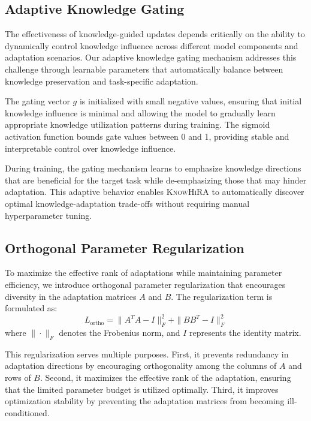 \documentclass[10pt,letterpaper]{article}
\begin{document}
\subsection{Adaptive Knowledge Gating}

The effectiveness of knowledge-guided updates depends critically on the ability to dynamically control knowledge influence across different model components and adaptation scenarios. Our adaptive knowledge gating mechanism addresses this challenge through learnable parameters that automatically balance between knowledge preservation and task-specific adaptation.

The gating vector $g$ is initialized with small negative values, ensuring that initial knowledge influence is minimal and allowing the model to gradually learn appropriate knowledge utilization patterns during training. The sigmoid activation function bounds gate values between 0 and 1, providing stable and interpretable control over knowledge influence.

During training, the gating mechanism learns to emphasize knowledge directions that are beneficial for the target task while de-emphasizing those that may hinder adaptation. This adaptive behavior enables \textsc{KnowHiRA} to automatically discover optimal knowledge-adaptation trade-offs without requiring manual hyperparameter tuning.

\subsection{Orthogonal Parameter Regularization}

To maximize the effective rank of adaptations while maintaining parameter efficiency, we introduce orthogonal parameter regularization that encourages diversity in the adaptation matrices $A$ and $B$. The regularization term is formulated as:
\begin{equation}
L_{\text{ortho}} = \|A^TA - I\|_F^2 + \|BB^T - I\|_F^2
\end{equation}
where $\|\cdot\|_F$ denotes the Frobenius norm, and $I$ represents the identity matrix.

This regularization serves multiple purposes. First, it prevents redundancy in adaptation directions by encouraging orthogonality among the columns of $A$ and rows of $B$. Second, it maximizes the effective rank of the adaptation, ensuring that the limited parameter budget is utilized optimally. Third, it improves optimization stability by preventing the adaptation matrices from becoming ill-conditioned.
\end{document}
